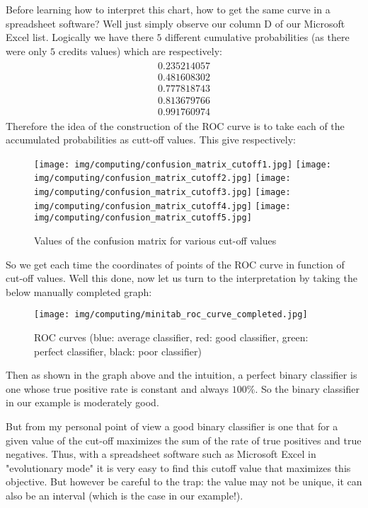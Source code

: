 	Before learning how to interpret this chart, how to get the same curve in a spreadsheet software? Well just simply observe our column D of our Microsoft Excel list. Logically we have there $5$ different cumulative probabilities (as there were only $5$ credits values) which are respectively:
	\begin{gather*}
		\begin{aligned}
		0.235214057\\
		0.481608302\\
		0.777818743\\
		0.813679766\\
		0.991760974
		\end{aligned}
	\end{gather*}
	Therefore the idea of the construction of the ROC curve is to take each of the accumulated probabilities as cutt-off values. This give respectively:
	\begin{figure}[H]
		\centering
		\texttt{[image: img/computing/confusion\_matrix\_cutoff1.jpg]}
		\texttt{[image: img/computing/confusion\_matrix\_cutoff2.jpg]}
		\texttt{[image: img/computing/confusion\_matrix\_cutoff3.jpg]}
		\texttt{[image: img/computing/confusion\_matrix\_cutoff4.jpg]}
		\texttt{[image: img/computing/confusion\_matrix\_cutoff5.jpg]}
		\caption{Values of the confusion matrix for various cut-off values}
	\end{figure}
	So we get each time the coordinates of points of the ROC curve in function of cut-off values. Well this done, now let us turn to the interpretation by taking the below manually completed graph:
	\begin{figure}[H]
		\centering
		\texttt{[image: img/computing/minitab\_roc\_curve\_completed.jpg]}
		\caption{ROC curves (blue: average classifier, red: good classifier, green: perfect classifier, black: poor classifier)}
	\end{figure}
	Then as shown in the graph above and the intuition, a perfect binary classifier is one whose true positive rate is constant and always $100\%$. So the binary classifier in our example is moderately good.
	
	But from my personal point of view a good binary classifier is one that for a given value of the cut-off maximizes the sum of the rate of true positives and true negatives. Thus, with a spreadsheet software such as Microsoft Excel in "evolutionary mode" it is very easy to find this cutoff value that maximizes this objective. But however be careful to the trap: the value may not be unique, it can also be an interval (which is the case in our example!).
	
